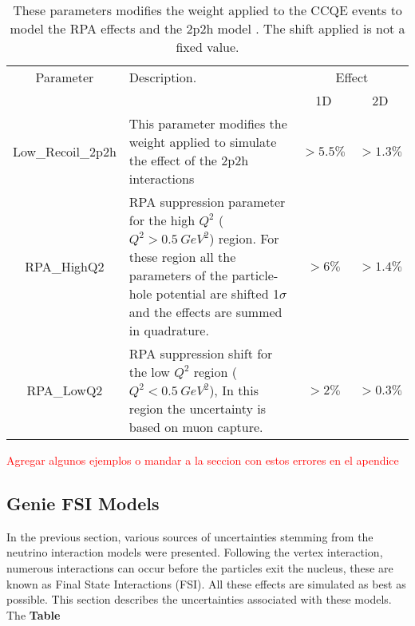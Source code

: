 \begin{table}[!htb]
    \centering
    \begin{tabular}{c|p{2in}|c|c}
        \hline 
        Parameter & Description.  & \multicolumn{2}{c}{Effect} \\
         & & 1D & 2D \\
        \hline  
        Low\_Recoil\_2p2h & This parameter modifies the weight applied to simulate the effect of the 2p2h interactions & $>5.5\%$ & $>1.3\%$ \\ \hline
        RPA\_HighQ2 & RPA suppression parameter for the high $Q^2$ ($Q^2 > 0.5\ GeV^2$) region. For these region all the parameters of the particle-hole potential are shifted 1$\sigma$ and the effects are summed in quadrature. & $>6\%$ & $>1.4\%$ \\ \hline
        RPA\_LowQ2 & RPA suppression shift for the low $Q^2$ region ($Q^2 < 0.5\ GeV^2$), In this region the uncertainty is based on muon capture. & $>2\%$ & $>0.3\%$ \\ \hline 
    \end{tabular}
    \caption{These parameters modifies the weight applied to the CCQE events to model the RPA effects \cite{RPAgran2017model} and the 2p2h model \cite{2p2hRodrigues_2016}. The shift applied is not a fixed value.}
    \label{tab:ErrorAnalysis:SystematicUnc:MnvTune}
\end{table}

\textcolor{red}{Agregar algunos ejemplos o mandar a la seccion con estos errores en el apendice}


\subsection{Genie FSI Models}
\label{Cap:ErrorAnalysis:SystematicUnc:GenieFSINucleons}
In the previous section, various sources of uncertainties stemming from the neutrino interaction models were presented. Following the vertex interaction, numerous interactions can occur before the particles exit the nucleus, these are known as Final State Interactions (FSI). All these effects are simulated as best as possible. This section describes the uncertainties associated with these models. The \textbf{Table} 

